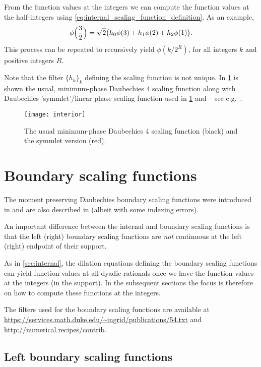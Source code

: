 \documentclass[a4paper]{scrartcl}
\begin{document}
From the function values at the integers we can compute the function values at the half-integers using \eqref{eq:internal_scaling_function_definition}.
As an example,
\begin{equation*}
	\phi\Bigl(\frac32\Bigr)
    = \sqrt2 \bigl(h_0 \phi(3) + h_1 \phi(2) + h_2 \phi(1)\bigr).
\end{equation*}
This process can be repeated to recursively yield $\phi(k/2^R)$, for all integers $k$ and positive integers $R$.

Note that the filter $\{h_k\}_k$ defining the scaling function is not unique.
In \cref{fig:Daubechies4} is shown the usual, minimum-phase Daubechies 4 scaling function along with Daubechies 'symmlet'/linear phase scaling function used in \cref{sec:boundary_Daubechies} and \cite{Cohen:Daubechies:Vial:1993} -- see e.g.\ \cite[Section 7.2.3]{Mallat:2009}.

\begin{figure}
	\centering
	\texttt{[image: interior]}
	\caption{The usual minimum-phase Daubechies 4 scaling function (black) and the symmlet version (red).}
	\label{fig:Daubechies4}
\end{figure}


\section{Boundary scaling functions}
\label{sec:boundary_Daubechies}

The moment preserving Daubechies boundary scaling functions were introduced in \cite{Cohen:Daubechies:Vial:1993} and are also described in \cite{Mallat:2009} (albeit with some indexing errors).

An important difference between the internal and boundary scaling functions is that the left (right) boundary scaling functions are \emph{not} continuous at the left (right) endpoint of their support.

As in \cref{sec:internal}, the dilation equations defining the boundary scaling functions can yield function values at all dyadic rationals once we have the function values at the integers (in the support).
In the subsequent sections the focus is therefore on how to compute these functions at the integers.

The filters used for the boundary scaling functions are available at \url{https://services.math.duke.edu/~ingrid/publications/54.txt} and \url{http://numerical.recipes/contrib}.


\subsection{Left boundary scaling functions}
\end{document}
